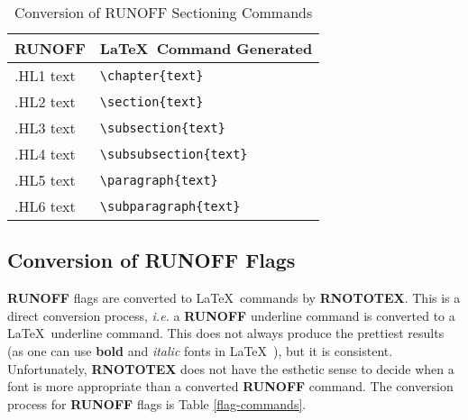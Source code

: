 \begin{table}[h]
\begin{center}
\begin{tabular}{ll}
{\large\bf RUNOFF }	    & {\LaTeX\ \large\bf Command Generated} \\ \hline
 .HL1 text      & \verb+\chapter{text}+ \\
 .HL2 text      & \verb+\section{text}+ \\
 .HL3 text      & \verb+\subsection{text}+ \\
 .HL4 text      & \verb+\subsubsection{text}+ \\
 .HL5 text      & \verb+\paragraph{text}+ \\
 .HL6 text      & \verb+\subparagraph{text}+ \\ \hline
\end{tabular}
\caption{Conversion of RUNOFF Sectioning Commands\label{section-commands}}
\end{center}
\end{table}

\subsection{Conversion of RUNOFF Flags}

{\bf RUNOFF} flags are converted to \LaTeX\ commands by {\bf RNOTOTEX}.   This
is a direct conversion process, {\em i.e.} a {\bf RUNOFF} underline command is
converted to a \LaTeX\ underline command.  This does not always produce the
prettiest results (as one can use {\bf bold} and {\it italic} fonts in \LaTeX\
), but it is consistent.  Unfortunately, {\bf RNOTOTEX} does not have the
esthetic sense to decide when a font is more appropriate than \index{esthetic
sense} a converted {\bf RUNOFF} command.  The conversion process for {\bf
RUNOFF} flags is Table \ref{flag-commands}.

